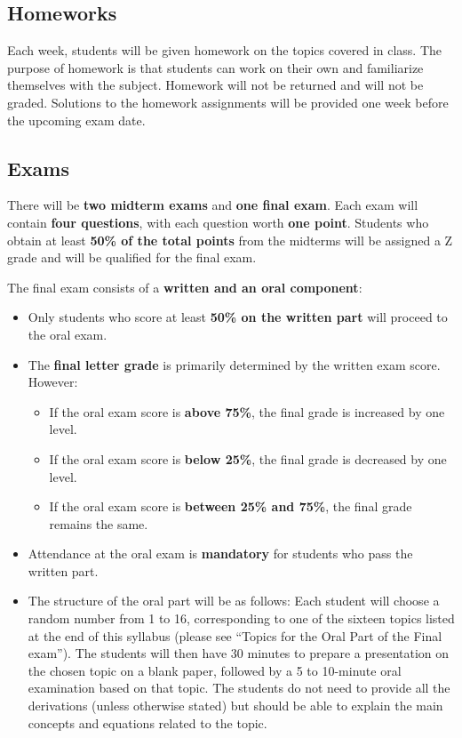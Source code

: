 \documentclass[11pt]{article}
\begin{document}
\subsection*{Homeworks} 
Each week, students will be given homework on the topics covered in class. The purpose of homework is that students can work on their own and familiarize themselves with the subject. Homework will not be returned and will not be graded.  Solutions to the homework assignments will be provided one week before the upcoming exam date.

\subsection*{Exams}  
There will be \textbf{two midterm exams} and \textbf{one final exam}. Each exam will contain \textbf{four questions}, with each question worth \textbf{one point}. Students who obtain at least \textbf{50\% of the total points} from the midterms will be assigned a Z grade and will be qualified for the final exam. 

The final exam consists of a \textbf{written and an oral component}:
\begin{itemize}
    \item Only students who score at least \textbf{50\% on the written part} will proceed to the oral exam.
    \item The \textbf{final letter grade} is primarily determined by the written exam score. However:
    \begin{itemize}
        \item If the oral exam score is \textbf{above 75\%}, the final grade is increased by one level.
        \item If the oral exam score is \textbf{below 25\%}, the final grade is decreased by one level.
        \item If the oral exam score is \textbf{between 25\% and 75\%}, the final grade remains the same.
    \end{itemize}
    \item Attendance at the oral exam is \textbf{mandatory} for students who pass the written part.
    \item The structure of the oral part will be as follows: Each student will choose a random number from 1 to 16, corresponding to one of the sixteen topics listed at the end of this syllabus (please see ``Topics for the Oral Part of the Final exam''). The students will then have 30 minutes to prepare a presentation on the chosen topic on a blank paper, followed by a 5 to 10-minute oral examination based on that topic. The students do not need to provide all the derivations (unless otherwise stated) but should be able to explain the main concepts and equations related to the topic.
\end{itemize}
\end{document}
